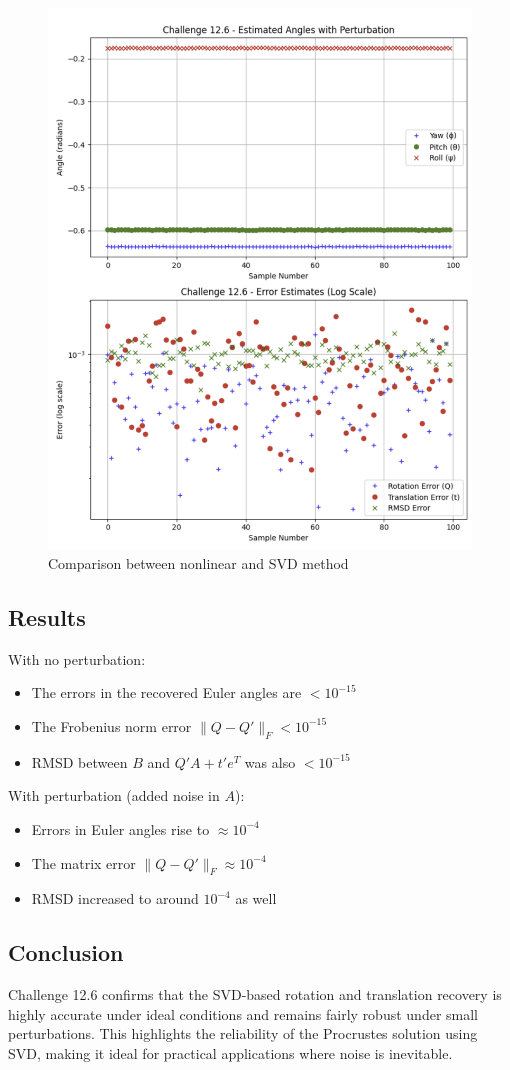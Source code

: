 \documentclass[12pt]{article}
\begin{document}
\begin{figure}[h]
    \centering
    \includegraphics[width=0.5\linewidth]{12_6.png}
    \caption{Comparison between nonlinear and SVD method}
    \label{fig:enter-label}
\end{figure}

\subsection*{Results}
With no perturbation:
\begin{itemize}
  \item The errors in the recovered Euler angles are \(< 10^{-15}\)
  \item The Frobenius norm error \( \| Q - Q' \|_F < 10^{-15} \)
  \item RMSD between \( B \) and \( Q'A + t'e^T \) was also \(< 10^{-15}\)
\end{itemize}

With perturbation (added noise in \( A \)):
\begin{itemize}
  \item Errors in Euler angles rise to \( \approx 10^{-4} \)
  \item The matrix error \( \|Q - Q'\|_F \approx 10^{-4} \)
  \item RMSD increased to around \( 10^{-4} \) as well
\end{itemize}

\subsection*{Conclusion}
Challenge 12.6 confirms that the SVD-based rotation and translation recovery is highly accurate under ideal conditions and remains fairly robust under small perturbations. This highlights the reliability of the Procrustes solution using SVD, making it ideal for practical applications where noise is inevitable.
\end{document}
